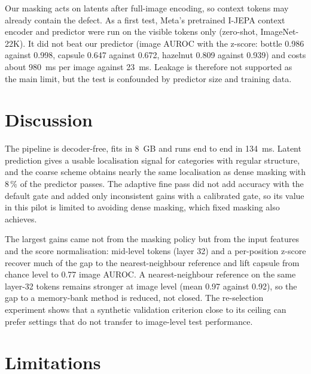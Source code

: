\documentclass[12pt,a4paper,oneside]{report}
\begin{document}
Our masking acts on latents after full-image encoding, so context tokens may
already contain the defect. As a first test, Meta's pretrained I-JEPA
context encoder and predictor were run on the visible tokens only
(zero-shot, ImageNet-22K). It did not beat our predictor (image AUROC with
the z-score: bottle 0.986 against 0.998, capsule 0.647 against 0.672,
hazelnut 0.809 against 0.939) and costs about 980~ms per image against
23~ms. Leakage is therefore not supported as the main limit, but the test is
confounded by predictor size and training data.

\section{Discussion}

The pipeline is decoder-free, fits in 8~GB and runs end to end in 134~ms.
Latent prediction gives a usable localisation signal for categories with
regular structure, and the coarse scheme obtains nearly the same
localisation as dense masking with 8\,\% of the predictor passes. The
adaptive fine pass did not add accuracy with the default gate and added only
inconsistent gains with a calibrated gate, so its value in this pilot is
limited to avoiding dense masking, which fixed masking also achieves.

The largest gains came not from the masking policy but from the input
features and the score normalisation: mid-level tokens (layer 32) and a
per-position z-score recover much of the gap to the nearest-neighbour
reference and lift capsule from chance level to 0.77 image AUROC. A
nearest-neighbour reference on the same layer-32 tokens remains stronger at
image level (mean 0.97 against 0.92), so the gap to a memory-bank method is
reduced, not closed. The re-selection experiment shows that a synthetic
validation criterion close to its ceiling can prefer settings that do not
transfer to image-level test performance.

\section{Limitations}
\end{document}

